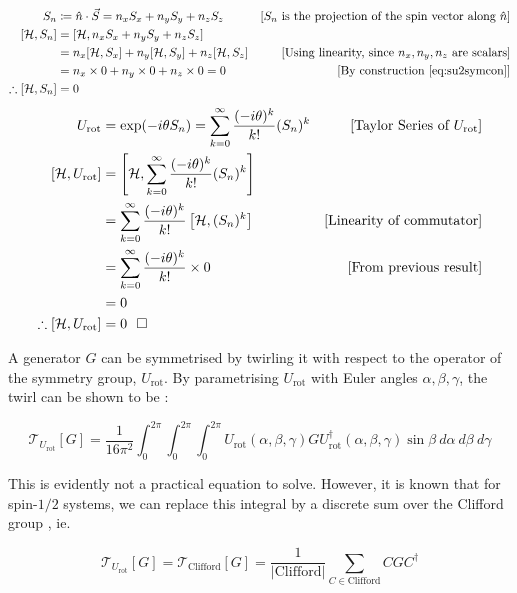 \documentclass{article}
\newcommand{\qed}{\hfill\square}
\newcommand{\twirl}[2]{\mathcal{T}_{#1}\left[#2\right]}
\newcommand{\ham}{\mathcal{H}}
\newcommand{\urot}{U_{\text{rot}}}
\begin{document}
\begin{align*}
S_n&\coloneq \hat{n} \cdot \vec{S} = n_xS_x + n_yS_y+n_zS_z & \text{[$S_n$ is the projection of the spin vector along $\hat n$]}\\
[\ham, S_n] &= [\ham , n_xS_x + n_yS_y+n_zS_z]\\
&= n_x[\ham, S_x] + n_y[\ham, S_y] + n_z[\ham, S_z] &\text{[Using linearity, since $n_x, n_y,n_z$ are scalars]}\\
&= n_x \times 0 +  n_y \times 0 +  n_z \times 0 = 0 &\text{[By construction \eqref{eq:su2symcon}]}\\
\therefore [\ham, S_n] &=0
\end{align*}
\begin{align*}
    \urot &= \exp(-i\theta S_n) = \sum_{k=0}^\infty\frac{(-i\theta)^k}{k!}(S_n)^k &\text{[Taylor Series of $\urot$]}\\
    [\ham, \urot] &= \left[\ham, \sum_{k=0}^\infty\frac{(-i\theta)^k}{k!}(S_n)^k \right]\\
    &= \sum_{k=0}^\infty\frac{(-i\theta)^k}{k!}\left[\ham,(S_n)^k \right] &\text{[Linearity of commutator]}\\
    &=\sum_{k=0}^\infty\frac{(-i\theta)^k}{k!}\times 0 &\text{[From previous result]}\\
    &= 0\\
    \therefore [\ham, \urot] &= 0 ~~\qed
\end{align*}

A generator $G$ can be symmetrised by twirling it with respect to the operator of the symmetry group, $\urot$. By parametrising $\urot$ with Euler angles $\alpha, \beta, \gamma$, the twirl can be shown to be \cite{shankar1994principles}:

\begin{equation*}
    \twirl{\urot}{G} = \frac{1}{16\pi^2}\int_0^{2\pi}\int_0^{2\pi}\int_0^{2\pi}\urot(\alpha, \beta,\gamma)G\urot^\dagger(\alpha, \beta,\gamma)\sin\beta~ d\alpha~ d\beta ~d\gamma
\end{equation*}

This is evidently not a practical equation to solve. However, it is known that for spin-$1/2$ systems, we can replace this integral by a discrete sum over the Clifford group \cite{tdesign}, ie.

\begin{equation}
    \twirl{\urot}{G} = \twirl{\text{Clifford}}{G} = \frac{1}{|\text{Clifford}|}\sum_{C \in \text{Clifford}}CGC^\dagger
\end{equation}
\end{document}
